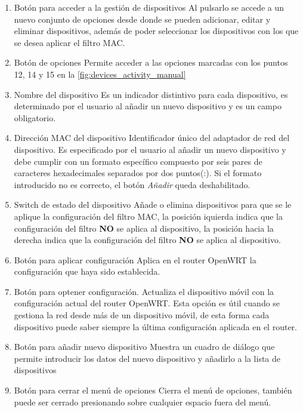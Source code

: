 \documentclass[12pt]{article}
\begin{document}
\begin{enumerate}
            \item Botón para acceder a la gestión de dispositivos
            Al pulsarlo se accede a un nuevo conjunto de opciones desde donde se pueden adicionar, editar y eliminar dispositivos, además de poder seleccionar los dispositivos con los que se desea aplicar el filtro MAC.
            \item Botón de opciones
            Permite acceder a las opciones marcadas con los puntos 12, 14 y 15 en la \ref{fig:devices_activity_manual}
            \item Nombre del dispositivo
            Es un indicador distintivo para cada dispositivo, es determinado por el usuario al añadir un nuevo dispositivo y es un campo obligatorio.
            \item Dirección MAC del dispositivo
            Identificador único del adaptador de red del dispositivo. Es especificado por el usuario al añadir un nuevo dispositivo y debe cumplir con un formato específico compuesto por seis pares de caracteres hexadecimales separados por dos puntos(:). Si el formato introducido no es correcto, el botón \textit{Añadir} queda deshabilitado.
            \item Switch de estado del dispositivo
            Añade o elimina dispositivos para que se le aplique la configuración del filtro MAC, la posición iquierda indica que la configuración del filtro \textbf{NO} se aplica al dispositivo, la posición hacia la derecha indica que la configuración del filtro \textbf{NO} se aplica al dispositivo.
            \item Botón para aplicar configuración
            Aplica en el router OpenWRT la configuración que haya sido establecida.
            \item Botón para optener configuración.
            Actualiza el dispositivo móvil con la configuración actual del router OpenWRT. Esta opción es útil cuando se gestiona la red desde más de un dispositivo móvil, de esta forma cada dispositivo puede saber siempre la última configuración aplicada en el router.
            \item Botón para añadir nuevo dispositivo
            Muestra un cuadro de diálogo que permite introducir los datos del nuevo dispositivo y añadirlo a la lista de dispositivos
            \item Botón para cerrar el menú de opciones
            Cierra el menú de opciones, también puede ser cerrado presionando sobre cualquier espacio fuera del menú.
            
        \end{enumerate}
\end{document}

